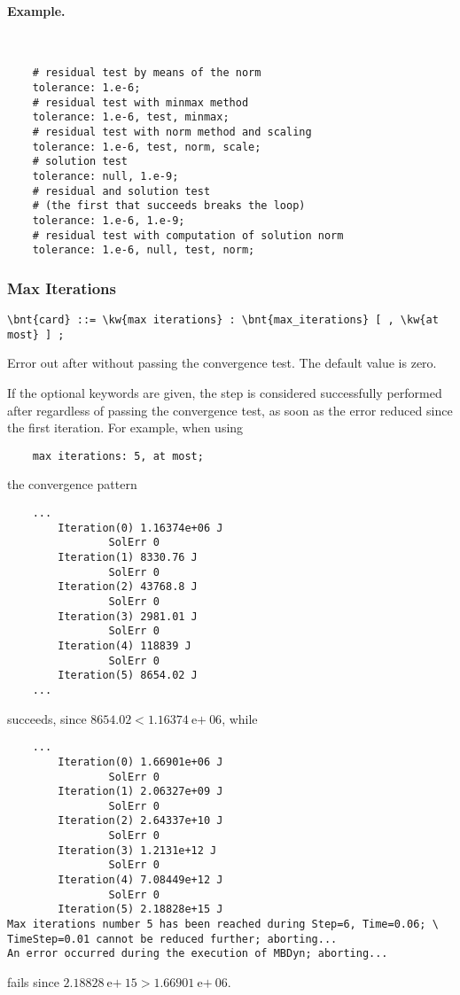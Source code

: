 \noindent
\paragraph{Example.} \
\begin{verbatim}
    # residual test by means of the norm
    tolerance: 1.e-6;
    # residual test with minmax method
    tolerance: 1.e-6, test, minmax;
    # residual test with norm method and scaling
    tolerance: 1.e-6, test, norm, scale;
    # solution test
    tolerance: null, 1.e-9;
    # residual and solution test
    # (the first that succeeds breaks the loop)
    tolerance: 1.e-6, 1.e-9;
    # residual test with computation of solution norm
    tolerance: 1.e-6, null, test, norm;
\end{verbatim}

\subsubsection{Max Iterations}
\begin{Verbatim}[commandchars=\\\{\}]
    \bnt{card} ::= \kw{max iterations} : \bnt{max_iterations} [ , \kw{at most} ] ;
\end{Verbatim}
Error out after  without passing the convergence test.
The default value is zero.

If the optional keywords  are given,
the step is considered successfully performed after 
regardless of passing the convergence test, as soon as the error
reduced since the first iteration.
For example, when using
\begin{verbatim}
    max iterations: 5, at most;
\end{verbatim}
the convergence pattern
\begin{verbatim}
    ...
        Iteration(0) 1.16374e+06 J
                SolErr 0
        Iteration(1) 8330.76 J
                SolErr 0
        Iteration(2) 43768.8 J
                SolErr 0
        Iteration(3) 2981.01 J
                SolErr 0
        Iteration(4) 118839 J
                SolErr 0
        Iteration(5) 8654.02 J
    ...
\end{verbatim}
succeeds, since $8654.02 < 1.16374\text{e$+$}06$, while
\begin{verbatim}
    ...
        Iteration(0) 1.66901e+06 J
                SolErr 0
        Iteration(1) 2.06327e+09 J
                SolErr 0
        Iteration(2) 2.64337e+10 J
                SolErr 0
        Iteration(3) 1.2131e+12 J
                SolErr 0
        Iteration(4) 7.08449e+12 J
                SolErr 0
        Iteration(5) 2.18828e+15 J
Max iterations number 5 has been reached during Step=6, Time=0.06; \
TimeStep=0.01 cannot be reduced further; aborting...
An error occurred during the execution of MBDyn; aborting... 
\end{verbatim}
fails since $2.18828\text{e$+$}15 > 1.66901\text{e$+$}06$.

